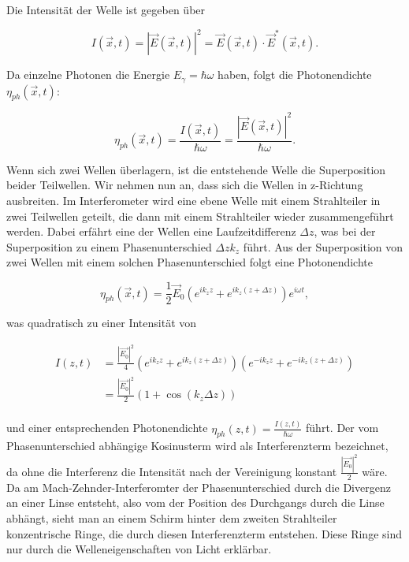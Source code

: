 \documentclass[a4paper,ngerman]{scrartcl}
\begin{document}
Die Intensität der Welle ist gegeben über 

\begin{equation}
I(\vec{x},t) = |\vec{E}(\vec{x},t)|^2 = \vec{E}(\vec{x},t) \cdot \vec{E}^*(\vec{x},t).
\end{equation}

Da einzelne Photonen die Energie $E_\gamma = \hbar \omega$ haben, folgt die Photonendichte $\eta_{ph}(\vec{x},t)$:

\begin{equation}
  \eta_{ph}(\vec{x},t) = \frac{I(\vec{x},t)}{\hbar \omega} = \frac{|\vec{E}(\vec{x},t)|^2}{\hbar \omega}.
\end{equation}

Wenn sich zwei Wellen überlagern, ist die entstehende Welle die Superposition beider Teilwellen.
Wir nehmen nun an, dass sich die Wellen in z-Richtung ausbreiten.
Im Interferometer wird eine ebene Welle mit einem Strahlteiler in zwei Teilwellen geteilt, die dann mit einem Strahlteiler wieder
zusammengeführt werden. Dabei erfährt eine der Wellen eine Laufzeitdifferenz $\Delta z$, was bei der Superposition zu
einem Phasenunterschied $\Delta z k_z$ führt. Aus der Superposition von zwei Wellen mit einem solchen Phasenunterschied
folgt eine Photonendichte

\begin{equation}
  \eta_{ph}(\vec{x},t) = \frac{1}{2} \vec{E}_0 \left( e^{i k_z z} + e^{i k_z (z + \Delta z)} \right) e^{i\omega t},
\end{equation}

was quadratisch zu einer Intensität von 

\begin{equation}
\label{eqn:intensitaet}
  \begin{split}
    I(z,t) &= \frac{|\vec{E_0}|^2 }{4} \left(e^{i k_z z} + e^{i k_z (z + \Delta z)} \right) \left(e^{-i k_z z} + e^{-i k_z (z + \Delta z)} \right)\\
    &= \frac{|\vec{E_0}|^2}{2}(1+\cos(k_z\Delta z) )\\
  \end{split}
\end{equation}

und einer entsprechenden Photonendichte $\eta_{ph}(z,t) = \frac{I(z,t)}{\hbar \omega}$ führt. Der vom Phasenunterschied abhängige
Kosinusterm wird als Interferenzterm bezeichnet, da ohne die Interferenz die Intensität nach der Vereinigung konstant $\frac{|\vec{E_0}|^2}{2}$
wäre. Da am Mach-Zehnder-Interferomter der Phasenunterschied durch die Divergenz an einer Linse entsteht, also vom der Position des Durchgangs
durch die Linse abhängt, sieht man an einem Schirm hinter dem zweiten Strahlteiler konzentrische Ringe, die durch diesen Interferenzterm
entstehen. Diese Ringe sind nur durch die Welleneigenschaften von Licht erklärbar.
\end{document}

